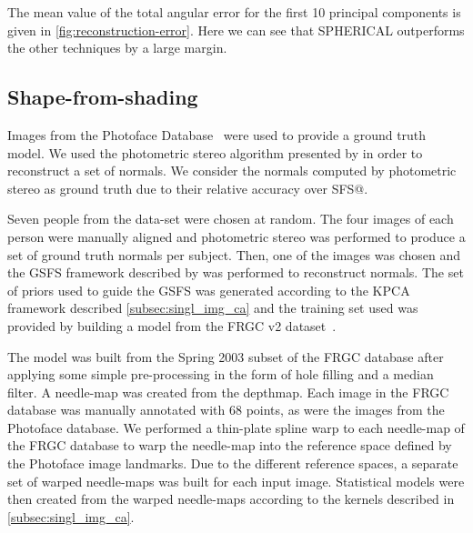 The mean value of the total angular error for the first 10 principal 
components is given in \cref{fig:reconstruction-error}. Here we can 
see that SPHERICAL outperforms the other techniques by a large margin.
\subsection{Shape-from-shading}
Images from the Photoface Database~\cite{zafeiriou2013photoface} were used to provide a 
ground truth model. We used the photometric stereo algorithm presented by 
\citet{barsky2003foursource} in order to reconstruct a set of normals. 
We consider the normals computed by photometric stereo as ground truth due to 
their relative accuracy over SFS@.

Seven people from the data-set were chosen at random. The four images of each 
person were manually aligned and photometric stereo was performed to produce a
set of ground truth normals per subject. Then, one of the images was chosen 
and the GSFS framework described by \citet{smith2006recovering,smith2008facial}
was performed to reconstruct normals. The set of priors used to guide the GSFS 
was generated according to the KPCA framework described 
\cref{subsec:singl_img_ca} and the training set used was provided by 
building a model from the FRGC v2 dataset~\cite{phillips2005overview}.

The model was built from the Spring 2003 subset of the FRGC database after 
applying some simple pre-processing in the form of hole filling and a median 
filter. A needle-map was created from the depthmap. Each image in the FRGC 
database was manually annotated with 68 points, as were the images from the 
Photoface database. We performed a thin-plate spline warp to each needle-map 
of the FRGC database to warp the needle-map into the reference space defined 
by the Photoface image landmarks. Due to the different reference spaces, a 
separate set of warped needle-maps was built for each input image. Statistical 
models were then created from the warped needle-maps according to the kernels 
described in \cref{subsec:singl_img_ca}.

